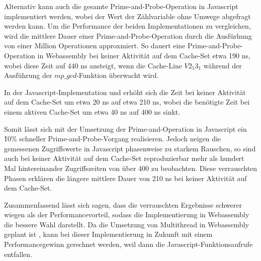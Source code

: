 Alternativ kann auch die gesamte Prime-and-Probe-Operation in Javascript implementiert werden, wobei der Wert der Zählvariable ohne Umwege abgefragt werden kann.
Um die Performance der beiden Implementationen zu vergleichen, wird die mittlere Dauer einer Prime-and-Probe-Operation durch die Ausfürhung von einer Million Operationen approxmiert.
So dauert eine Prime-and-Probe-Operation in Webassembly bei keiner Aktivität auf dem Cache-Set etwa 190 ns, wobei diese Zeit auf 440 ns ansteigt, wenn die Cache-Line $V2_5 3_1$ während der Ausführung der $mp\_gcd$-Funktion überwacht wird.

In der Javascript-Implementation und erhöht sich die Zeit bei keiner Aktivität auf dem Cache-Set um etwa 20 ns auf etwa 210 ns, wobei die benötigte Zeit bei einem aktiven Cache-Set um etwa 40 ns auf 400 ns sinkt.

Somit lässt sich mit der Umsetzung der Prime-and-Operation in Javascript ein \~ 10\% schneller Prime-and-Probe-Vorgang realisieren.
Jedoch neigen die gemessenen Zugriffswerte in Javascript phasenweise zu starkem Rauschen, so sind auch bei keiner Aktivität auf dem Cache-Set reproduzierbar mehr als hundert Mal hintereinander Zugriffszeiten von über 400 zu beobachten.
Diese verrauschten Phasen erklären die längere mittlere Dauer von 210 ns bei keiner Aktivität auf dem Cache-Set.

Zusammenfassend lässt sich sagen, dass die verrauschten Ergebnisse schwerer wiegen als der Performancevorteil, sodass die Implementierung in Webassembly die bessere Wahl darstellt.
Da die Umsetzung von Multithread in Webassembly geplant ist \cite{WebassemblyThreads}, kann bei dieser Implementierung in Zukunft mit einem Performancegewinn gerechnet werden, weil dann die Javascript-Funktionsaufrufe entfallen.